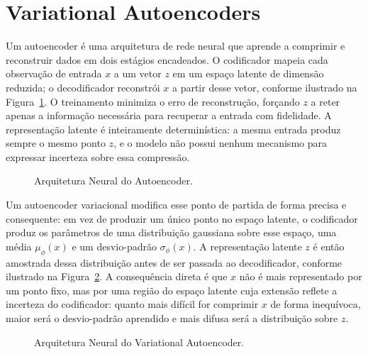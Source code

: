 \section{Variational Autoencoders}
\label{sec:vae}

Um autoencoder é uma arquitetura de rede neural que aprende a comprimir e reconstruir
dados em dois estágios encadeados. O codificador mapeia cada observação de entrada $x$
a um vetor $z$ em um espaço latente de dimensão reduzida; o decodificador reconstrói
$x$ a partir desse vetor, conforme ilustrado na Figura~\ref{fig:autoencoder}. O
treinamento minimiza o erro de reconstrução, forçando $z$ a reter apenas a informação
necessária para recuperar a entrada com fidelidade. A representação latente é
inteiramente determinística: a mesma entrada produz sempre o mesmo ponto $z$, e o
modelo não possui nenhum mecanismo para expressar incerteza sobre essa compressão.

\begin{figure}[ht]
    \centering
    
    \caption{Arquitetura Neural do Autoencoder.}
    \label{fig:autoencoder}
\end{figure}

Um autoencoder variacional \parencite{kingma2014} modifica esse ponto de partida de
forma precisa e consequente: em vez de produzir um único ponto no espaço latente, o
codificador produz os parâmetros de uma distribuição gaussiana sobre esse espaço, uma
média $\mu_\phi(x)$ e um desvio-padrão $\sigma_\phi(x)$. A representação latente $z$
é então amostrada dessa distribuição antes de ser passada ao decodificador, conforme
ilustrado na Figura~\ref{fig:variational_autoencoder}. A consequência direta é que $x$
não é mais representado por um ponto fixo, mas por uma região do espaço latente cuja
extensão reflete a incerteza do codificador: quanto mais difícil for comprimir $x$ de
forma inequívoca, maior será o desvio-padrão aprendido e mais difusa será a
distribuição sobre $z$.

\begin{figure}[ht]
    \centering
    
    \caption{Arquitetura Neural do Variational Autoencoder.}
    \label{fig:variational_autoencoder}
\end{figure}


